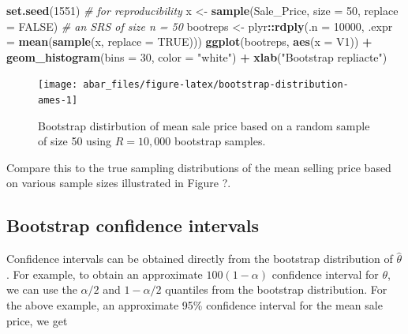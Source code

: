 \documentclass[]{book}
\newenvironment{Shaded}{\begin{snugshade}}{\end{snugshade}}
\newcommand{\CommentTok}[1]{\textcolor[rgb]{0.56,0.35,0.01}{\textit{#1}}}
\newcommand{\DataTypeTok}[1]{\textcolor[rgb]{0.13,0.29,0.53}{#1}}
\newcommand{\DecValTok}[1]{\textcolor[rgb]{0.00,0.00,0.81}{#1}}
\newcommand{\KeywordTok}[1]{\textcolor[rgb]{0.13,0.29,0.53}{\textbf{#1}}}
\newcommand{\NormalTok}[1]{#1}
\newcommand{\OperatorTok}[1]{\textcolor[rgb]{0.81,0.36,0.00}{\textbf{#1}}}
\newcommand{\OtherTok}[1]{\textcolor[rgb]{0.56,0.35,0.01}{#1}}
\newcommand{\StringTok}[1]{\textcolor[rgb]{0.31,0.60,0.02}{#1}}
\theoremstyle{definition}
\theoremstyle{definition}
\theoremstyle{definition}
\theoremstyle{remark}
\begin{document}
\begin{Shaded}
\begin{Highlighting}[]
\KeywordTok{set.seed}\NormalTok{(}\DecValTok{1551}\NormalTok{)  }\CommentTok{# for reproducibility}
\NormalTok{x <-}\StringTok{ }\KeywordTok{sample}\NormalTok{(Sale_Price, }\DataTypeTok{size =} \DecValTok{50}\NormalTok{, }\DataTypeTok{replace =} \OtherTok{FALSE}\NormalTok{)  }\CommentTok{# an SRS of size n = 50}
\NormalTok{bootreps <-}\StringTok{ }\NormalTok{plyr}\OperatorTok{::}\KeywordTok{rdply}\NormalTok{(}\DataTypeTok{.n =} \DecValTok{10000}\NormalTok{, }\DataTypeTok{.expr =} \KeywordTok{mean}\NormalTok{(}\KeywordTok{sample}\NormalTok{(x, }\DataTypeTok{replace =} \OtherTok{TRUE}\NormalTok{)))}
\KeywordTok{ggplot}\NormalTok{(bootreps, }\KeywordTok{aes}\NormalTok{(}\DataTypeTok{x =}\NormalTok{ V1)) }\OperatorTok{+}
\StringTok{  }\KeywordTok{geom_histogram}\NormalTok{(}\DataTypeTok{bins =} \DecValTok{30}\NormalTok{, }\DataTypeTok{color =} \StringTok{"white"}\NormalTok{) }\OperatorTok{+}
\StringTok{  }\KeywordTok{xlab}\NormalTok{(}\StringTok{"Bootstrap repliacte"}\NormalTok{)}
\end{Highlighting}
\end{Shaded}

\begin{figure}

{\centering \texttt{[image: abar\_files/figure-latex/bootstrap-distribution-ames-1]} 

}

\caption{Bootstrap distirbution of mean sale price based on a random sample of size 50 using $R = 10,000$ bootstrap samples.}\label{fig:bootstrap-distribution-ames}
\end{figure}

Compare this to the true sampling distributions of the mean selling
price based on various sample sizes illustrated in Figure ?.

\hypertarget{bootstrap-confidence-intervals}{%
\subsection{Bootstrap confidence
intervals}\label{bootstrap-confidence-intervals}}

Confidence intervals can be obtained directly from the bootstrap
distribution of \(\widehat{\theta}\). For example, to obtain an
approximate \(100\left(1 - \alpha\right)\) confidence interval for
\(\theta\), we can use the \(\alpha / 2\) and \(1 - \alpha / 2\)
quantiles from the bootstrap distribution. For the above example, an
approximate 95\% confidence interval for the mean sale price, we get
\end{document}
